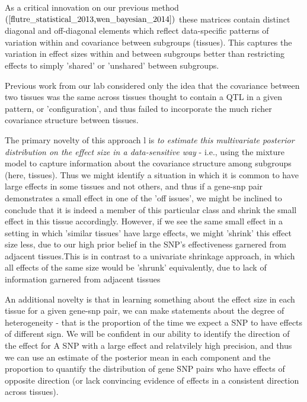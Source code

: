 \documentclass[10pt,letterpaper]{article}
\begin{document}
As a critical innovation on our previous method $(\cite{flutre_statistical_2013,wen_bayesian_2014})$ these matrices contain distinct diagonal and off-diagonal elements which reflect data-specific patterns of variation within and covariance between subgroups (tissues). This captures the variation in effect sizes within and between subgroups better than restricting effects to simply 'shared' or 'unshared' between subgroups. 

Previous work from our lab considered only the idea that the covariance between two tissues was the same across tissues thought to contain a QTL in a given pattern, or 'configuration',  and thus failed to incorporate the much richer covariance structure between tissues. 

The primary novelty of this approach l is {\it to estimate this multivariate posterior distribution on the effect size in a data-sensitive way} - i.e., using the mixture model to capture information about the covariance structure among subgroups (here, tissues). Thus we might identify a situation in which it is common to have large effects in some tissues and not others, and thus if a gene-snp pair demonstrates a small effect in one of the 'off issues', we might be inclined to conclude that it is indeed a member of this particular class and shrink the small effect in this tissue accordingly. However, if we see the same small effect in a setting in which 'similar tissues' have large effects, we might 'shrink' this effect size less, due to our high prior belief in the SNP's effectiveness garnered from adjacent tissues.This is in contrast to a univariate shrinkage approach, in which all effects of the same size would be 'shrunk' equivalently, due to lack of information garnered from adjacent tissues 



An additional novelty is that in learning something about the effect size in each tissue for a given gene-snp pair, we can make statements about the degree of heterogeneity - that is the proportion of the time we expect a SNP to have effects of different sign. We will be confident in our ability to identify the direction of the effect for A SNP with a large effect and relatvilely high precision, and thus we can use an estimate of the posterior mean in each component and the proportion to quantify the distribution of gene SNP pairs who have effects of opposite direction (or lack convincing evidence of effects in a consistent direction across tissues).
\end{document}
